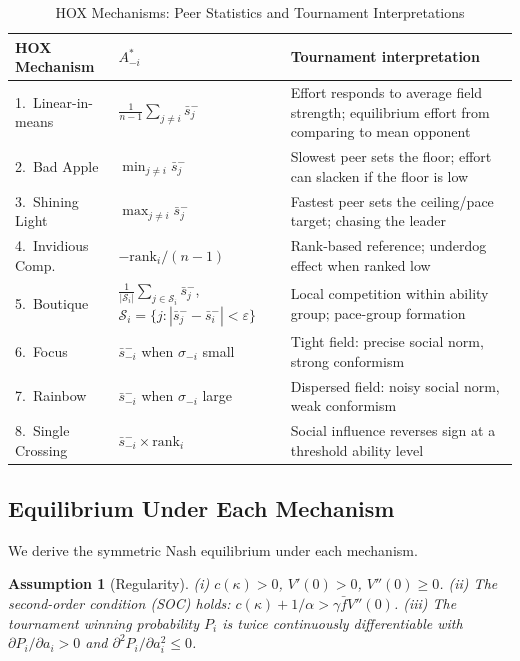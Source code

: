 \documentclass[12pt]{article}
\newtheorem{assumption}{Assumption}
\theoremstyle{definition}
\theoremstyle{remark}
\begin{document}
\begin{table}[H]
\centering
\caption{HOX Mechanisms: Peer Statistics and Tournament Interpretations}
\label{tab:hox_map}
\begin{tabular}{llp{5.5cm}}
\toprule
HOX Mechanism & $A_{-i}^*$ & Tournament interpretation\\
\midrule
1.\ Linear-in-means  & $\frac{1}{n-1}\sum_{j\neq i}\bar{s}_j^-$ &
  Effort responds to average field strength; equilibrium effort from comparing to mean opponent\\
2.\ Bad Apple        & $\min_{j\neq i}\bar{s}_j^-$ &
  Slowest peer sets the floor; effort can slacken if the floor is low\\
3.\ Shining Light    & $\max_{j\neq i}\bar{s}_j^-$ &
  Fastest peer sets the ceiling/pace target; chasing the leader\\
4.\ Invidious Comp.  & $-\text{rank}_i / (n-1)$ &
  Rank-based reference; underdog effect when ranked low\\
5.\ Boutique         & $\frac{1}{|\mathcal{S}_i|}\sum_{j\in\mathcal{S}_i}\bar{s}_j^-$,\; $\mathcal{S}_i =\{j: |\bar{s}_j^- - \bar{s}_i^-|<\varepsilon\}$ &
  Local competition within ability group; pace-group formation\\
6.\ Focus            & $\bar{s}_{-i}^-$ when $\sigma_{-i}$ small &
  Tight field: precise social norm, strong conformism\\
7.\ Rainbow          & $\bar{s}_{-i}^-$ when $\sigma_{-i}$ large &
  Dispersed field: noisy social norm, weak conformism\\
8.\ Single Crossing  & $\bar{s}_{-i}^- \times \text{rank}_i$ &
  Social influence reverses sign at a threshold ability level\\
\bottomrule
\end{tabular}
\end{table}

\subsection{Equilibrium Under Each Mechanism}
\label{subsec:equilibria}

We derive the symmetric Nash equilibrium under each mechanism.

\begin{assumption}[Regularity]
\label{ass:reg}
(i) $c(\kappa)>0$, $V'(0)>0$, $V''(0)\geq 0$.
(ii) The second-order condition (SOC) holds: $c(\kappa) + 1/\alpha > \gamma\bar{f} V''(0)$.
(iii) The tournament winning probability $P_i$ is twice continuously differentiable
with $\partial P_i/\partial a_i > 0$ and $\partial^2 P_i/\partial a_i^2 \leq 0$.
\end{assumption}
\end{document}
